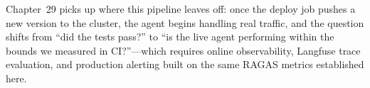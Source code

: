 Chapter~29 picks up where this pipeline leaves off: once the deploy job
pushes a new version to the cluster, the agent begins handling real
traffic, and the question shifts from ``did the tests pass?'' to ``is
the live agent performing within the bounds we measured in CI?''---which
requires online observability, Langfuse trace evaluation, and
production alerting built on the same RAGAS metrics established here.
